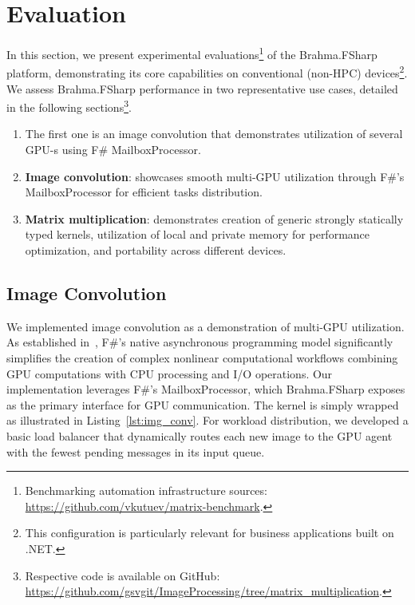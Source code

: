 \section{Evaluation}

In this section, we present experimental evaluations\footnote{Benchmarking automation infrastructure sources: \url{https://github.com/vkutuev/matrix-benchmark}.} of the Brahma.FSharp platform, demonstrating its core capabilities on conventional (non-HPC) devices\footnote{This configuration is particularly relevant for business applications built on .NET.}. 
We assess Brahma.FSharp performance in two representative use cases, detailed in the following sections\footnote{
Respective code is available on GitHub: \url{https://github.com/gsvgit/ImageProcessing/tree/matrix_multiplication}.    
}.
\begin{enumerate}
\item The first one is an image convolution that demonstrates utilization of several GPU-s using F\# MailboxProcessor.
\item \textbf{Image convolution}: showcases smooth multi-GPU utilization through F\#'s MailboxProcessor for efficient tasks distribution.
\item \textbf{Matrix multiplication}: demonstrates creation of generic strongly statically typed kernels, utilization of local and private memory for performance optimization, and portability across different devices.
\end{enumerate}


\subsection{Image Convolution}

We implemented image convolution as a demonstration of multi-GPU utilization.
As established in~\cite{aleaGPUasync}, F\#'s native asynchronous programming model significantly simplifies the creation of complex nonlinear computational workflows combining GPU computations with CPU processing and I/O operations.
Our implementation leverages F\#'s MailboxProcessor, which Brahma.FSharp exposes as the primary interface for GPU communication.
The kernel is simply wrapped as illustrated in Listing~\ref{lst:img_conv}. 
For workload distribution, we developed a basic load balancer that dynamically routes each new image to the GPU agent with the fewest pending messages in its input queue.

